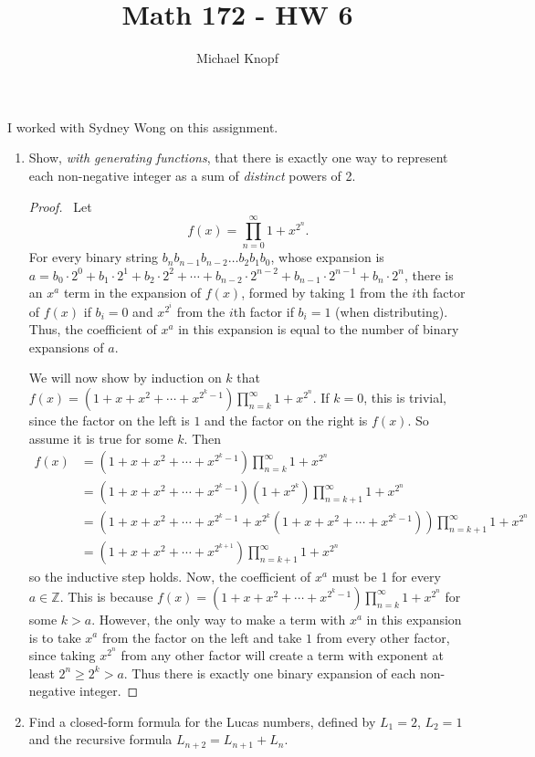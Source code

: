 \documentclass[12pt]{article}
\newcommand{\Z}{\mathbb{Z}}
\begin{document}
 


\title{Math 172 - HW 6}
\author{Michael Knopf}
 
\maketitle

\noindent I worked with Sydney Wong on this assignment.

\begin{enumerate}[leftmargin=0cm,itemindent=.5cm,labelwidth=\itemindent,labelsep=0cm,align=left]

\item Show, \emph{with generating functions}, that there is exactly one way to represent each non-negative integer as a sum of \emph{distinct} powers of 2.

\begin{proof}
\ Let $$f(x) = \prod_{n=0}^\infty 1 + x^{2^n}.$$  For every binary string $b_nb_{n-1}b_{n-2} \dots b_2b_1b_0$, whose expansion is $a = b_0 \cdot 2^0 + b_1 \cdot 2^1 + b_2 \cdot 2^2 + \cdots + b_{n-2} \cdot 2^{n-2} + b_{n-1} \cdot 2^{n-1} + b_{n} \cdot 2^{n}$, there is an $x^a$ term in the expansion of $f(x)$, formed by taking 1 from the $i$th factor of $f(x)$ if $b_i = 0$ and $x^{2^i}$ from the $i$th factor if $b_i = 1$ (when distributing).  Thus, the coefficient of $x^a$ in this expansion is equal to the number of binary expansions of $a$.

We will now show by induction on $k$ that $f(x) = (1+x+x^2 + \cdots + x^{2^k -1})\prod_{n=k}^\infty 1 + x^{2^n}$.  If $k = 0$, this is trivial, since the factor on the left is $1$ and the factor on the right is $f(x)$.  So assume it is true for some $k$.  Then
\begin{align*}
f(x) &= (1+x+x^2 + \cdots + x^{2^k -1})\prod_{n=k}^\infty 1 + x^{2^n}
\\
&= (1+x+x^2 + \cdots + x^{2^k -1})(1 + x^{2^k})\prod_{n=k+1}^\infty 1 + x^{2^n}
\\
&= (1+x+x^2 + \cdots + x^{2^k -1} + x^{2^k}(1+x+x^2 + \cdots + x^{2^k -1}))\prod_{n=k+1}^\infty 1 + x^{2^n}
\\
&= (1+x+x^2 + \cdots + x^{2^{k+1}})\prod_{n=k+1}^\infty 1 + x^{2^n}
\end{align*}
so the inductive step holds.  Now, the coefficient of $x^a$ must be 1 for every $a \in \Z$.  This is because $f(x) = (1+x+x^2 + \cdots + x^{2^k -1})\prod_{n=k}^\infty 1 + x^{2^n}$ for some $k > a$.  However, the only way to make a term with $x^a$ in this expansion is to take $x^a$ from the factor on the left and take $1$ from every other factor, since taking $x^{2^n}$ from any other factor will create a term with exponent at least $2^n \geq 2^k > a$.  Thus there is exactly one binary expansion of each non-negative integer.
\end{proof}
\pagebreak
\item Find a closed-form formula for the Lucas numbers, defined by $L_1 = 2$, $L_2 = 1$ and the recursive formula $L_{n+2} = L_{n+1} + L_n$.


\end{enumerate}
\end{document}

